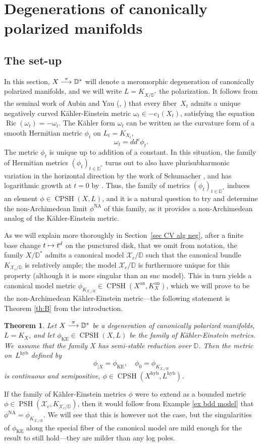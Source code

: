 \documentclass[JEP,XML,SOM,Unicode,published]{cedram}
\newcommand\mto{\mathchoice{\longmapsto}{\mapsto}{\mapsto}{\mapsto}}
\newcommand{\To}[1]{\mathchoice{\xrightarrow{\textstyle\kern4pt#1\kern3pt}}{\stackrel{#1}{\longrightarrow}}{}{}}
\newtheorem{theo}[equation]{Theorem}
\theoremstyle{definition}
\newcommand \D {\mathbb{D}}
\newcommand \X {\mathscr{X}}
\newcommand{\an}{\mathrm{an}}
\DeclareMathOperator{\CPSH}{CPSH}
\newcommand{\hyb}{\mathrm{hyb}}
\DeclareMathOperator{\KE}{KE}
\DeclareMathOperator{\NA}{NA}
\DeclareMathOperator{\PSH}{PSH}
\DeclareMathOperator{\Ric}{Ric}
\begin{document}
\section{Degenerations of canonically polarized manifolds} \label{sec KE neg}
\subsection{The set-up} \label{sec setup neg}
In this section, $X \To{\pi} \D^*$ will denote a meromorphic degeneration of canonically polarized manifolds, and we will write $L = K_{X/\D^*}$ the polarization. It follows from the seminal work of Aubin and Yau (\cite{Au}, \cite{Y}) that every fiber~$X_t$ admits a unique negatively curved Kähler-Einstein metric $\omega_t \in -c_1(X_t)$, satisfying the equation $\Ric(\omega_t) = - \omega_t$. The Kähler form $\omega_t$ can be written as the curvature form of a smooth Hermitian metric $\phi_t$ on $L_t = K_{X_t}$, \ie\vspace*{-3pt}
\[
\omega_t = dd^c \phi_t.
\]
The metric $\phi_t$ is unique up to addition of a constant. In this situation, the family of Hermitian metrics $(\phi_t)_{t \in \D^*}$ turns out to also have plurisubharmonic variation in the horizontal direction by the work of Schumacher \cite{Schu}, and has logarithmic growth at $t=0$ by \cite[Th.\,3]{Schu}. Thus, the family of metrics $(\phi_t)_{t \in \D^*}$ induces an element $\phi \in \CPSH(X, L)$, and it is a natural question to try and determine the non-Archimedean limit $\phi^{\NA}$ of this family, as it provides a non-Archimedean analog of the Kähler-Einstein metric.

As we will explain more thoroughly in Section~\ref{sec CV alg neg}, after a finite base change $t \mto t^d$ on the punctured disk, that we omit from notation, the family $X/ \D^*$ admits a canonical model $\X_c / \D$ such that the canonical bundle $K_{\X_c / \D}$ is relatively ample; the model $\X_c / \D$ is furthermore unique for this property (although it is more singular than an snc model). This in turn yields a canonical model metric $\phi_{K_{\X_c /R}} \in \CPSH(X^{\an}, K_X^{\an})$, which we will prove to be the non-Archimedean Kähler-Einstein metric---the following statement is Theorem \ref{th:B} from the introduction.
\begin{theo} \label{THEO KE NEG}
Let $X \To{\pi} \D^*$ be a degeneration of canonically polarized manifolds, $L = K_X$, and let $\phi_{\KE} \in \CPSH(X, L)$ be the family of Kähler-Einstein metrics. We~assu\-me that the family $X$ has semi-stable reduction over $\D$. Then the metric on~$L^{\hyb}$ defined by\vspace*{-3pt}
\[
\phi_{| X} = \phi_{\KE},\quad\phi_0 = \phi_{K_{\X_c/R}}
\]
is continuous and semipositive, \ie $\phi \in \CPSH(X^{\hyb}, L^{\hyb})$.
\end{theo}
If the family of Kähler-Einstein metrics $\phi$ were to extend as a bounded metric $\phi \in \PSH(\X_c, K_{\X_c / \D})$, then it would follow from Example \ref{ex bdd model} that $\phi^{\NA} = \phi_{K_{\X_c/R}}$. We will see that this is however not the case, but the singularities of $\phi_{\KE}$ along the special fiber of the canonical model are mild enough for the result to still hold---they are milder than any log poles.
\end{document}
